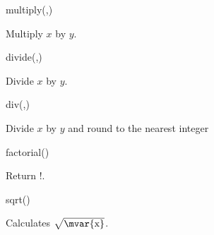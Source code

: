 \begin{math-function}{multiply(,)}
\mathcommand

  Multiply $x$ by $y$.

\begin{codeexample}[]
 \pgfmathresult
\end{codeexample}
\end{math-function}

\begin{math-function}{divide(,)}
\mathcommand

  Divide $x$ by $y$.

\begin{codeexample}[]
 \pgfmathresult
\end{codeexample}
\end{math-function}

\begin{math-function}{div(,)}
\mathcommand

  Divide $x$ by $y$ and round to the nearest integer

\begin{codeexample}[]
 \pgfmathresult
\end{codeexample}
\end{math-function}

\begin{math-function}{factorial()}
\mathcommand

  Return !.

\begin{codeexample}[]
 \pgfmathresult
\end{codeexample}

\end{math-function}

\begin{math-function}{sqrt()}
\mathcommand

 Calculates $\sqrt{\textrm{\mvar{x}}}$.

\begin{codeexample}[]
 \pgfmathresult
\end{codeexample}

\begin{codeexample}[]
  \pgfmathresult
\end{codeexample}

\end{math-function}

